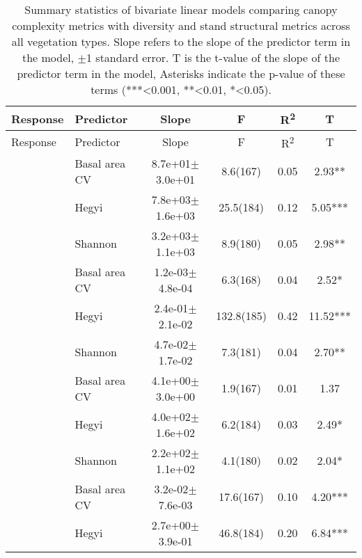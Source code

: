 {\setlength{\tabcolsep}{3pt}
\begin{longtable}{llcccS[table-format=-2.2, table-space-text-post = {***}]}
\caption[Bivariate linear model summary]{Summary statistics of bivariate linear models comparing canopy complexity metrics with diversity and stand structural metrics across all vegetation types. Slope refers to the slope of the predictor term in the model, $\pm$1 standard error. T is the t-value of the slope of the predictor term in the model, Asterisks indicate the p-value of these terms (***<0.001, **<0.01, *<0.05).} 
\label{tls:bivar_lm_summ_all} \\
\toprule
{Response} & {Predictor} & {Slope} & {F} & {R\textsuperscript{2}} & {T} \\ 
\midrule
\endfirsthead
\toprule
{Response} & {Predictor} & {Slope} & {F} & {R\textsuperscript{2}} & {T} \\ 
\midrule
\endhead
{} & Basal area CV &  8.7e+01$\pm$3.0e+01 & 8.6(167) & 0.05 & 2.93** \\* 
   & Hegyi &  7.8e+03$\pm$1.6e+03 & 25.5(184) & 0.12 & 5.05*** \\* 
   & Shannon &  3.2e+03$\pm$1.1e+03 & 8.9(180) & 0.05 & 2.98** \\ 
   \midrule
{} & Basal area CV &  1.2e-03$\pm$4.8e-04 & 6.3(168) & 0.04 & 2.52* \\* 
   & Hegyi &  2.4e-01$\pm$2.1e-02 & 132.8(185) & 0.42 & 11.52*** \\* 
   & Shannon &  4.7e-02$\pm$1.7e-02 & 7.3(181) & 0.04 & 2.70** \\ 
   \midrule
{} & Basal area CV &  4.1e+00$\pm$3.0e+00 & 1.9(167) & 0.01 & 1.37 \\* 
   & Hegyi &  4.0e+02$\pm$1.6e+02 & 6.2(184) & 0.03 & 2.49* \\* 
   & Shannon &  2.2e+02$\pm$1.1e+02 & 4.1(180) & 0.02 & 2.04* \\ 
   \midrule
{} & Basal area CV &  3.2e-02$\pm$7.6e-03 & 17.6(167) & 0.10 & 4.20*** \\* 
   & Hegyi &  2.7e+00$\pm$3.9e-01 & 46.8(184) & 0.20 & 6.84*** \\* 

\end{longtable}}
